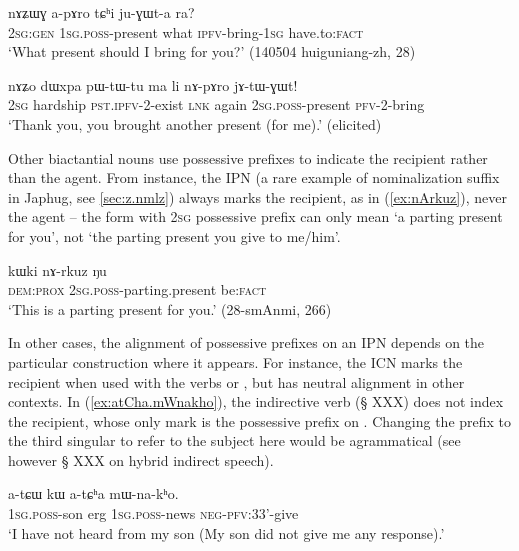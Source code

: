\begin{exe}
\ex \label{ex:apAro}
\gll nɤʑɯɣ a-pɤro tɕʰi ju-ɣɯt-a ra? \\
\textsc{2sg:gen} \textsc{1sg}.\textsc{poss}-present what \textsc{ipfv}-bring-\textsc{1sg} have.to:\textsc{fact} \\
\glt `What present should I bring for you?' (140504 huiguniang-zh, 28)
\end{exe}

\begin{exe}
\ex \label{ex:nApAro}
\gll nɤʑo dɯxpa pɯ-tɯ-tu ma li nɤ-pɤro jɤ-tɯ-ɣɯt! \\
\textsc{2sg} hardship \textsc{pst}.\textsc{ipfv}-2-exist \textsc{lnk} again \textsc{2sg}.\textsc{poss}-present \textsc{pfv}-2-bring \\
\glt `Thank you, you brought another present (for me).' (elicited)
\end{exe}

Other biactantial nouns use possessive prefixes to indicate the recipient rather than the agent. From instance, the IPN  (a rare example of  nominalization suffix in Japhug, see \ref{sec:z.nmlz}) always marks the recipient, as in (\ref{ex:nArkuz}), never the agent -- the form  with \textsc{2sg} possessive prefix can only mean `a parting present for you', not `the parting present you give to me/him'.

\begin{exe}
\ex \label{ex:nArkuz}
\gll  kɯki nɤ-rkuz ŋu \\
\textsc{dem}:\textsc{prox} \textsc{2sg}.\textsc{poss}-parting.present be:\textsc{fact} \\
\glt `This is a parting present for you.' (28-smAnmi, 266)
\end{exe}

In other cases, the alignment of possessive prefixes on an IPN depends on the  particular construction where it appears. For instance, the ICN  marks the recipient when used with the verbs  or , but has neutral alignment in other contexts. In (\ref{ex:atCha.mWnakho}), the indirective verb  (§ XXX) does not index the recipient, whose only mark is the possessive prefix on . Changing the prefix to the third singular  to refer to the subject here would be agrammatical (see however § XXX on hybrid indirect speech).


\begin{exe}
\ex \label{ex:atCha.mWnakho}
\gll  a-tɕɯ kɯ a-tɕʰa mɯ-na-kʰo. \\
\textsc{1sg}.\textsc{poss}-son erg \textsc{1sg}.\textsc{poss}-news \textsc{neg}-\textsc{pfv}:3\fl{}3'-give \\
\glt `I have not heard from my son (My son did not give me any response).' 
\end{exe}

